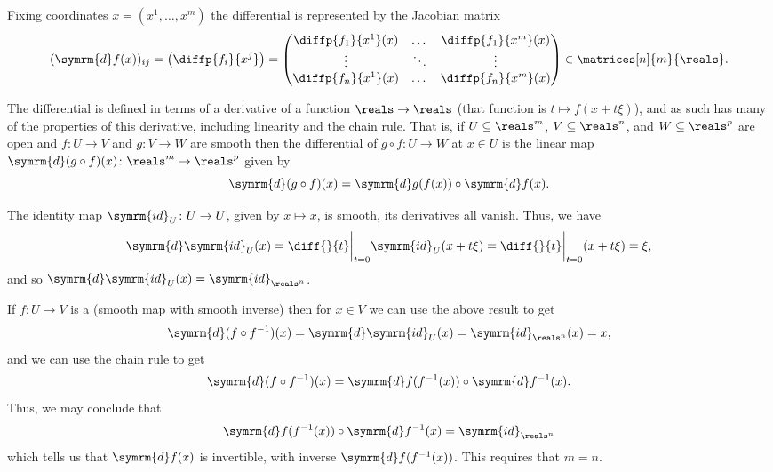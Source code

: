 \documentclass[fleqn]{NotesClass}
\renewcommand{\dl}{\symrm{d}}
\newcommand{\id}{\symrm{id}}
\begin{document}
    Fixing coordinates \(x = (x^1, \dotsc, x^m)\) the differential is represented by the Jacobian matrix
    \begin{equation}
        (\dl f(x))_{ij} = \left( \diffp{f_i}{x^j} \right) = 
        \begin{pmatrix}
            \diffp{f_1}{x^1}(x) & \dots & \diffp{f_1}{x^m}(x)\\
            \vdots & \ddots & \vdots\\
            \diffp{f_n}{x^1}(x) & \dots & \diffp{f_n}{x^m}(x)
        \end{pmatrix}
        \in \matrices[n]{m}{\reals}.
    \end{equation}
    
    The differential is defined in terms of a derivative of a function \(\reals \to \reals\) (that function is \(t \mapsto f(x + t\xi)\)), and as such has many of the properties of this derivative, including linearity and the chain rule.
    That is, if \(U \subseteq \reals^m\), \(V \subseteq \reals^n\), and \(W \subseteq \reals^p\) are open and \(f \colon U \to V\) and \(g \colon V \to W\) are smooth then the differential of \(g \circ f \colon U \to W\) at \(x \in U\) is the linear map \(\dl (g \circ f)(x) \colon \reals^m \to \reals^p\) given by
    \begin{equation}
        \dl (g \circ f)(x) = \dl g(f(x)) \circ \dl f(x).
    \end{equation}
    
    The identity map \(\id_U \colon U \to U\), given by \(x \mapsto x\), is smooth, its derivatives all vanish.
    Thus, we have
    \begin{equation}
        \dl \id_U (x) = \diff{}{t} \bigg|_{t = 0} \id_U(x + t\xi) = \diff{}{t} \bigg|_{t = 0} (x + t\xi) = \xi,
    \end{equation}
    and so \(\dl \id_U(x) = \id_{\reals^n}\).
    
    If \(f \colon U \to V\) is a  (smooth map with smooth inverse) then for \(x \in V\) we can use the above result to get
    \begin{align}
        \dl (f \circ f^{-1})(x) = \dl \id_U(x) = \id_{\reals^n}(x) = x,
    \end{align}
    and we can use the chain rule to get
    \begin{equation}
        \dl (f \circ f^{-1})(x) = \dl f(f^{-1}(x)) \circ \dl f^{-1}(x).
    \end{equation}
    Thus, we may conclude that
    \begin{equation}
        \dl f(f^{-1}(x)) \circ \dl f^{-1}(x) = \id_{\reals^n}
    \end{equation}
    which tells us that \(\dl f(x)\) is invertible, with inverse \(\dl f(f^{-1}(x))\).
    This requires that \(m = n\).
    
\end{document}
